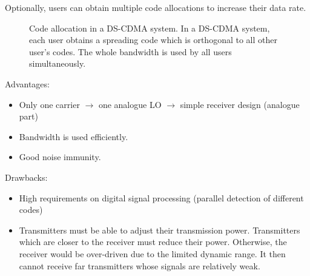 \begin{refsection}
\begin{remark}
	Optionally, users can obtain multiple code allocations to increase their data rate.
\end{remark}

\begin{figure}[H]
	\centering
	\caption[Code allocation in a \acs{DS-CDMA} system]{Code allocation in a \acs{DS-CDMA} system. In a \acs{DS-CDMA} system, each user obtains a spreading code which is orthogonal to all other user's codes. The whole bandwidth is used by all users simultaneously.}
\end{figure}

Advantages:
\begin{itemize}
	\item Only one carrier $\rightarrow$ one analogue \ac{LO} $\rightarrow$ simple receiver design (analogue part)
	\item Bandwidth is used efficiently.
	\item Good noise immunity.
\end{itemize}

Drawbacks:
\begin{itemize}
	\item High requirements on digital signal processing (parallel detection of different codes)
	\item Transmitters must be able to adjust their transmission power. Transmitters which are closer to the receiver must reduce their power. Otherwise, the receiver would be over-driven due to the limited dynamic range. It then cannot receive far transmitters whose signals are relatively weak.
\end{itemize}


\end{refsection}
